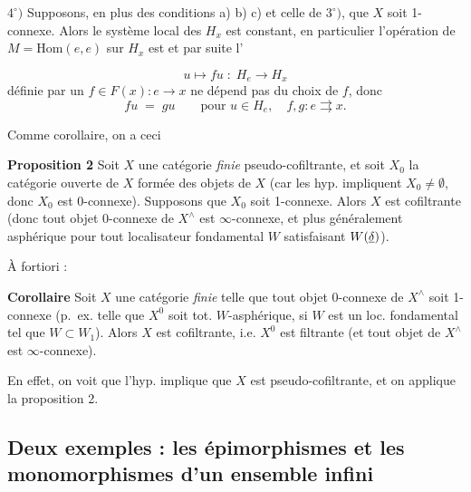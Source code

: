 \documentclass[11pt,a4paper]{article}
\begin{document}
$4^{\circ})$ Supposons, \struck{\ill{}} en plus des conditions a) b) c) et
celle de $3^{\circ})$, que $X$ soit 1-connexe. Alors le système local des $H_x$
est  constant,  en particulier 
l'opération de $M = \mathrm{Hom}(e,e)$ sur $H_x$ est \struck{\ill{}} et par
suite l'


\[
  u \longmapsto fu \;:\; H_e \longrightarrow H_x
\]
définie par un $f \in F(x) : e \to x$ ne dépend pas du choix de $f$, donc
\[
  fu \;=\; gu \qquad \text{pour } u \in H_e, \quad
  f, g : e \rightrightarrows x .
\]


Comme corollaire, on a ceci

\textbf{Proposition 2} Soit $X$ une catégorie \emph{finie}
pseudo-cofiltrante,  et soit $X_0$ la
catégorie
ouverte de $X$ formée des  objets de $X$
(car les hyp. impliquent $X_0 \neq \emptyset$\struck{)}, donc $X_0$ est
0-connexe). Supposons que $X_0$ soit 1-connexe. Alors $X$ est cofiltrante
(donc tout objet 0-connexe de $X^\wedge$ est $\infty$-connexe, et plus
généralement asphérique pour tout \struck{\ill{}}
localisateur fondamental $W$ satisfaisant
$W(\uncertain{\delta})$).

À fortiori :

\textbf{Corollaire} Soit $X$ une catégorie \emph{finie} telle que tout objet
0-connexe de $X^\wedge$ soit 1-connexe (p.~ex. telle que $X^0$ soit tot.
$W$-asphérique, si $W$ est un loc. fondamental tel que $W \subset W_1$). Alors
$X$ est cofiltrante, i.e. $X^0$ est filtrante (et tout objet de $X^\wedge$ est
$\infty$-connexe).



En effet, on voit \ill{} que l'hyp. implique que $X$ est pseudo-cofiltrante,
et on applique la proposition 2.

\subsection*{Deux exemples : les épimorphismes et les monomorphismes d'un ensemble infini}
\end{document}
